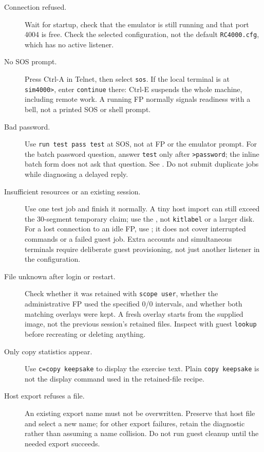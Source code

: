\begin{description}
\item[Connection refused.] Wait for startup, check that the emulator is still
running and that port 4004 is free. Check the selected configuration, not
the default \texttt{RC4000.cfg}, which has no active listener.
\item[No SOS prompt.] Press Ctrl-A in Telnet, then select \texttt{sos}.
If the local terminal is at \texttt{sim4000>}, enter \texttt{continue} there:
Ctrl-E suspends the whole machine, including remote work. A running FP normally
signals readiness with a bell, not a printed SOS or shell prompt.
\item[Bad password.] Use \texttt{run test pass test} at SOS, not at FP or the
emulator prompt. For the batch password question, answer \texttt{test} only
after \texttt{>password}; the inline batch form does not ask that question.
See . Do not submit duplicate
jobs while diagnosing a delayed reply.
\item[Insufficient resources or an existing session.] Use one test job and
finish it normally. A tiny host import can still exceed the 30-segment temporary
claim; use the , not
\texttt{kitlabel} or a larger disk. For a lost connection to an idle FP, use
; it does
not cover interrupted commands or a failed guest job. Extra accounts and
simultaneous terminals require deliberate guest provisioning, not just another
listener in the configuration.
\item[File unknown after login or restart.] Check whether it was retained with
\texttt{scope user}, whether the administrative FP used the specified 0/0
intervals, and whether both matching overlays were kept. A fresh overlay starts
from the supplied image, not the previous session's retained files. Inspect
with guest \texttt{lookup} before recreating or deleting anything.
\item[Only copy statistics appear.] Use \texttt{c=copy keepsake} to display the
exercise text. Plain \texttt{copy keepsake} is not the display command used in
the retained-file recipe.
\item[Host export refuses a file.] An existing export name must not be
overwritten. Preserve that host file and select a new name; for other export
failures, retain the diagnostic rather than assuming a name collision. Do not
run guest cleanup until the needed export succeeds.

\end{description}
